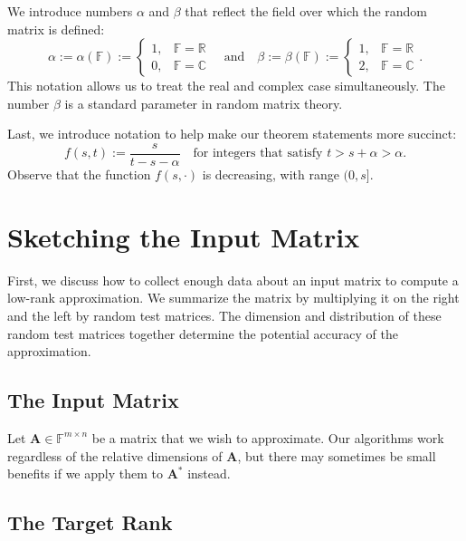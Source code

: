\documentclass[final]{siamart1116}
\numberwithin{equation}{section}
\numberwithin{theorem}{section}
\numberwithin{figure}{section}
\newcommand{\R}{\mathbb{R}}
\newcommand{\C}{\mathbb{C}}
\newcommand{\F}{\mathbb{F}}
\newcommand{\mtx}[1]{\bm{#1}}
\begin{document}
We introduce numbers $\alpha$ and $\beta$
that reflect the field over which the random matrix is defined:
\begin{equation} \label{eqn:alpha-parameter}
\alpha := \alpha(\F) := \begin{cases} 1, & \F = \R \\ 0, & \F = \C \end{cases}
\quad\text{and}\quad
\beta := \beta(\F) := \begin{cases} 1, & \F = \R \\ 2, & \F = \C \end{cases}.
\end{equation}
This notation allows us to treat the real and complex case simultaneously.
The number $\beta$ is a standard parameter in random matrix theory.

Last, we introduce notation to help make our theorem statements more succinct:
\begin{equation} \label{eqn:f-intro}
f(s, t) := \frac{s}{t - s - \alpha}
\quad\text{for integers that satisfy $t > s + \alpha > \alpha$.}
\end{equation}
Observe that the function $f(s, \cdot)$ is decreasing, with range $(0, s]$.


\section{Sketching the Input Matrix}
\label{sec:mult-sketching}

First, we discuss how to collect enough data about an input matrix
to compute a low-rank approximation.  We summarize the matrix by multiplying it on
the right and the left by random test matrices.
The dimension and distribution of these random test matrices
together determine the potential accuracy of the approximation.


\subsection{The Input Matrix}

Let $\mtx{A} \in \F^{m \times n}$ be a matrix
that we wish to approximate.
Our algorithms work regardless of the relative dimensions
of $\mtx{A}$, but there may sometimes be small benefits
if we apply them to $\mtx{A}^*$ instead.



\subsection{The Target Rank}
\end{document}
